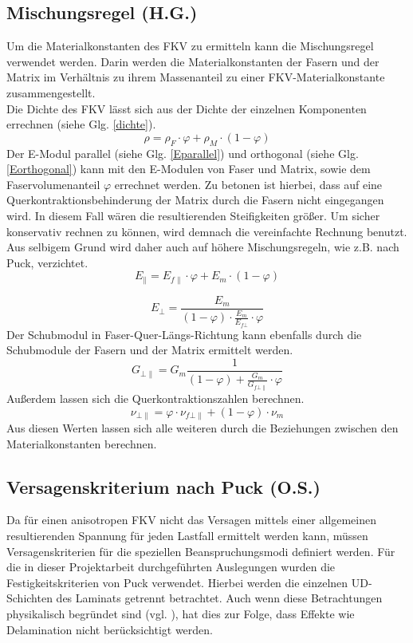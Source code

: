\subsection{Mischungsregel (H.G.)}
Um die Materialkonstanten des FKV zu ermitteln kann die Mischungsregel verwendet werden. Darin werden die Materialkonstanten der Fasern und der Matrix im Verhältnis zu ihrem Massenanteil zu einer FKV-Materialkonstante zusammengestellt.\\
\noindent
Die Dichte des FKV lässt sich aus der Dichte der einzelnen Komponenten errechnen (siehe Glg. \ref{dichte}).
\begin{equation}
\label{dichte}
	\rho=\rho_{F}\cdot\varphi +\rho_{M}\cdot (1-\varphi)
\end{equation}
\noindent
Der E-Modul parallel (siehe Glg. \ref{Eparallel}) und orthogonal (siehe Glg. \ref{Eorthogonal}) kann mit den E-Modulen von Faser und Matrix, sowie dem Faservolumenanteil $\varphi$ errechnet werden. Zu betonen ist hierbei, dass auf eine Querkontraktionsbehinderung der Matrix durch die Fasern nicht eingegangen wird. In diesem Fall wären die resultierenden Steifigkeiten größer. Um sicher konservativ rechnen zu können, wird demnach die vereinfachte Rechnung benutzt. Aus selbigem Grund wird daher auch auf höhere Mischungsregeln, wie z.B. nach Puck, verzichtet. 
\begin{equation}
\label{Eparallel}
E_{\|}=E_{f\|}\cdot \varphi+E_{m}\cdot (1-\varphi)
\end{equation}

\begin{equation}
\label{Eorthogonal}
E_{\bot}=\frac{E_{m}}{(1-\varphi)\cdot\frac{E_{m}}{E_{f\bot}}\cdot\varphi}
\end{equation}
\noindent
Der Schubmodul in Faser-Quer-Längs-Richtung kann ebenfalls durch die Schubmodule der Fasern und der Matrix ermittelt werden.
\begin{equation}
G_{\bot\|}=G_{m}\frac{1}{(1-\varphi)+\frac{G_{m}}{G_{f\bot\|}}\cdot\varphi}
\end{equation}
Außerdem lassen sich die Querkontraktionszahlen berechnen.
\begin{equation}
\nu_{\bot\|}=\varphi\cdot \nu_{f\bot\|}+(1-\varphi)\cdot \nu_{m}
\end{equation}
Aus diesen Werten lassen sich alle weiteren durch die Beziehungen zwischen den Materialkonstanten berechnen.\cite{item3}
\newpage
\subsection{Versagenskriterium nach Puck (O.S.)}
Da für einen anisotropen FKV nicht das Versagen mittels einer allgemeinen resultierenden Spannung für jeden Lastfall ermittelt werden kann, müssen Versagenskriterien für die speziellen Beanspruchungsmodi definiert werden. Für die in dieser Projektarbeit durchgeführten Auslegungen wurden die Festigkeitskriterien von Puck verwendet. Hierbei werden die einzelnen UD-Schichten des Laminats getrennt betrachtet. Auch wenn diese Betrachtungen physikalisch begründet sind (vgl. \cite{EdL}), hat dies zur Folge, dass Effekte wie Delamination nicht berücksichtigt werden.

